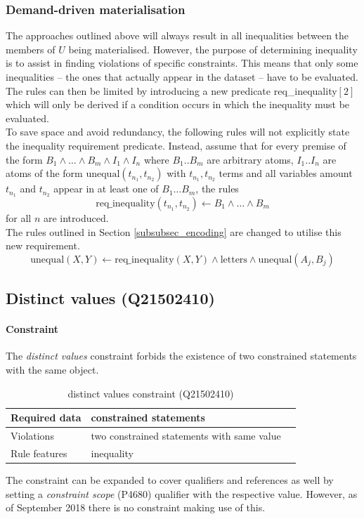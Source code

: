 \documentclass[hyperref,bachelorofscience,fleqn]{cgvpub}
\begin{document}
\subsubsection{Demand-driven materialisation}\label{subsubsec_demand-driven_materialisation}
The approaches outlined above will always result in all inequalities between the members of \(U\) being materialised. However, the purpose of determining inequality is to assist in finding violations of specific constraints. This means that only some inequalities -- the ones that actually appear in the dataset -- have to be evaluated. The rules can then be limited by introducing a new predicate req\_inequality\([2]\) which will only be derived if a condition occurs in which the inequality must be evaluated.\\

To save space and avoid redundancy, the following rules will not explicitly state the inequality requirement predicate. Instead, assume that for every premise of the form \(B_1 \wedge \ldots\wedge B_m \wedge I_1 \wedge I_n\) where \(B_1 .. B_m\) are arbitrary atoms, \(I_1 .. I_n\) are atoms of the form \(\text{unequal}(t_{n_1}, t_{n_2})\) with \(t_{n_1}, t_{n_2}\) terms and all variables amount \(t_{n_1}\) and \(t_{n_2}\) appear in at least one of \(B_1 \ldots B_m\), the rules 
\begin{equation*}
\text{req\_inequality}(t_{n_1}, t_{n_2})
 \leftarrow B_1 \wedge \ldots \wedge B_m
\end{equation*} for all \(n\) are introduced.\\

The rules outlined in Section \ref{subsubsec_encoding} are changed to utilise this new requirement.
\begin{equation*}
\text{unequal}(X, Y) \leftarrow \text{req\_inequality}	(X, Y) \wedge \text{letters} \wedge \text{unequal}(A_j, B_j)
\end{equation*}

\subsection{Distinct values (Q21502410)}\label{subsec_distinct_values}
\paragraph{Constraint}
The \emph{distinct values} constraint forbids the existence of two constrained statements with the same object.
\begin{table}[H]
\caption{distinct values constraint (Q21502410)}
\begin{tabularx}{\textwidth}{ ll X}
\hline
Required data & constrained statements \\
\hline
Violations & two constrained statements with same value \\
\hline
Rule features & inequality \\
\hline
\end{tabularx}
\end{table}
The constraint can be expanded to cover qualifiers and references as well by setting a \emph{constraint scope} (P4680) qualifier with the respective value. However, as of September 2018 there is no constraint making use of this.
\end{document}
